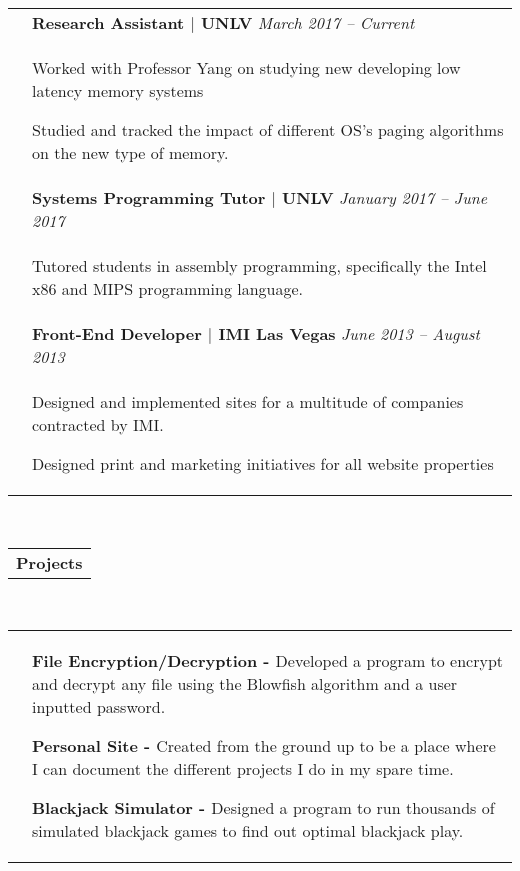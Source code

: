 \documentclass[a4paper,12pt]{extarticle}
\begin{document}
\begin{tabular}[b]{p{1.3cm} p{14.4cm}}
	& {\bf{Research Assistant $|$ UNLV}} \hfill \emph{\footnotesize{March 2017 -- Current}}
    \\ & \small{ \begin{compactitem}
    	\item Worked with Professor Yang on studying new developing low latency\hyphenation{memory} memory systems
    	\item Studied and tracked the impact of different OS's paging algorithms on the new type of memory.
	\end{compactitem}} \smallskip \\
    & {\bf{Systems Programming Tutor $|$ UNLV}} \hfill \emph{\footnotesize{January 2017 -- June 2017}}
    \\ & \small{ \begin{compactitem}
    	\item Tutored students in assembly programming, specifically the Intel x86 and MIPS programming language.
	\end{compactitem}} \smallskip \\
    & {\bf{Front-End Developer $|$ IMI Las Vegas}} \hfill \emph{\footnotesize{June 2013 -- August 2013}}
    \\ & \small{\begin{compactitem}
    	\item Designed and implemented sites for a multitude of companies contracted by IMI.
        \item Designed print and marketing initiatives for all website properties
	\end{compactitem}}
\end{tabular} \\
\raggedright{\begin{tabular}[b]{p{5.5cm}}
	\bf{\Large{Projects}} \\
    \cline{1-1}
\end{tabular}} \\
	\begin{tabular}[b]{p{.6cm} p{14.4cm}}
	&
    \begin{compactitem}
    	\item \small{\bf{File Encryption/Decryption - }}Developed a program to encrypt and decrypt any file using the Blowfish algorithm and a user inputted password.
	\end{compactitem} \medskip
    \begin{compactitem}
        \item \small{\bf{Personal Site - }}Created from the ground up to be a place where I can document the different projects I do in my spare time.
	\end{compactitem} \medskip
    \begin{compactitem}
        \item \small{\bf{Blackjack Simulator - }}Designed a program to run thousands of simulated blackjack games to find out optimal blackjack play.
	\end{compactitem}
\end{tabular}
\end{document}
